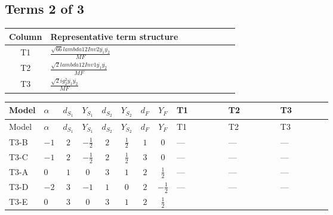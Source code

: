 \documentclass[8pt]{article}
\begin{document}
\begin{landscape}
\subsection*{Terms 2 of 3}
\begin{center}
\begin{tabular}{@{}c >{\raggedright\arraybackslash}p{0.82\linewidth}@{}}
\toprule
Column & Representative term structure \\
\midrule
T1 & \(\displaystyle \frac{\sqrt{66} lambda12Inv2 \overline{y_{1}} \overline{y_{2}}}{MF}\) \\
\midrule
T2 & \(\displaystyle \frac{\sqrt{2} lambda12Inv1 \overline{y_{1}} \overline{y_{2}}}{MF}\) \\
\midrule
T3 & \(\displaystyle \frac{\sqrt{2} i g_{2}^{2} \overline{y_{1}} \overline{y_{2}}}{MF}\) \\
\midrule
\bottomrule
\end{tabular}
\end{center}
\smallskip
\tiny
\begin{longtable}{@{}llcccccc >{\raggedright\arraybackslash}p{0.21\linewidth} >{\raggedright\arraybackslash}p{0.21\linewidth} >{\raggedright\arraybackslash}p{0.21\linewidth}@{}}
\toprule
Model & $\alpha$ & $d_{S_1}$ & $Y_{S_1}$ & $d_{S_2}$ & $Y_{S_2}$ & $d_F$ & $Y_F$ & T1 & T2 & T3 \\
\midrule
\endfirsthead
\toprule
Model & $\alpha$ & $d_{S_1}$ & $Y_{S_1}$ & $d_{S_2}$ & $Y_{S_2}$ & $d_F$ & $Y_F$ & T1 & T2 & T3 \\
\midrule
\endhead
T3-B & $-1$ & $2$ & $-\frac{1}{2}$ & $2$ & $\frac{1}{2}$ & $1$ & $0$ & --- & --- & --- \\
\midrule
T3-C & $-1$ & $2$ & $-\frac{1}{2}$ & $2$ & $\frac{1}{2}$ & $3$ & $0$ & --- & --- & --- \\
\midrule
T3-A & $0$ & $1$ & $0$ & $3$ & $1$ & $2$ & $\frac{1}{2}$ & --- & --- & --- \\
\midrule
T3-D & $-2$ & $3$ & $-1$ & $1$ & $0$ & $2$ & $-\frac{1}{2}$ & --- & --- & --- \\
\midrule
T3-E & $0$ & $3$ & $0$ & $3$ & $1$ & $2$ & $\frac{1}{2}$ & \scriptsize\adjustbox{max width=\linewidth}{$\begin{gathered} - \frac{3 \sqrt{66} lambda12Inv2 \overline{y_{1}} \overline{y_{2}}}{44 MF}\end{gathered}$} & \scriptsize\adjustbox{max width=\linewidth}{$\begin{gathered} \frac{\sqrt{2} lambda12Inv1 \overline{y_{1}} \overline{y_{2}}}{4 MF}\end{gathered}$} & \scriptsize\adjustbox{max width=\linewidth}{$\begin{gathered} - \frac{\sqrt{2} i g_{2}^{2} \overline{y_{1}} \overline{y_{2}}}{4 MF}\end{gathered}$} \\
\midrule
\bottomrule
\end{longtable}
\clearpage

\end{landscape}
\end{document}

